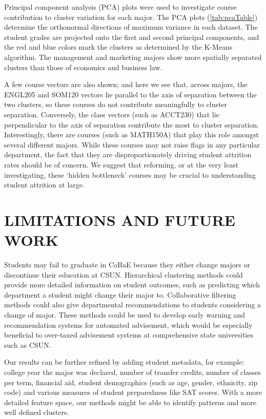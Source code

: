 \documentclass{sigchi}
\begin{document}
Principal component analysis (PCA) plots were used to investigate course contribution to cluster variation for each major. The PCA plots (\ref{tab:pcaTable}) determine the orthonormal directions of maximum variance in each dataset. The student grades are projected onto the first and second principal components, and the red and blue colors mark the clusters as determined by the K-Means algorithm. The management and marketing majors show more spatially separated clusters than those of economics and business law. 

A few course vectors are also shown; and here we see that, across majors, the ENGL205 and SOM120 vectors lie parallel  to the axis of separation between the two clusters, so these courses do not contribute meaningfully to cluster separation. Conversely, the class vectors (such as ACCT230) that lie perpendicular to the axis of separation contribute the most to cluster separation. Interestingly, there are courses (such as MATH150A) that play this role amongst several different majors. While these courses may not raise flags in any particular department, the fact that they are disproportionately driving student attrition rates should be of concern. We suggest that reforming, or at the very least investigating, these ‘hidden bottleneck’ courses may be crucial to understanding student attrition at large.



\section{LIMITATIONS AND FUTURE WORK}


Students may fail to graduate in CoBaE because they either change majors or discontinue their education at CSUN.  Hierarchical clustering methods could provide more detailed information on student outcomes, such as predicting which department a student might change their major to. Collaborative filtering methods could also give departmental recommendations to students considering a change of major. These methods could be used to develop early warning and recommendation systems for automated advisement, which would be especially beneficial to over-taxed advisement systems at comprehensive state universities such as CSUN.

Our results can be further refined by adding student metadata, for example: college year the major was declared, number of transfer credits, number of classes per term, financial aid, student demographics (such as age, gender, ethnicity, zip code) and various measures of student preparedness like SAT scores. With a more detailed feature space, our methods might be able to identify patterns and more well defined clusters. 
\end{document}
